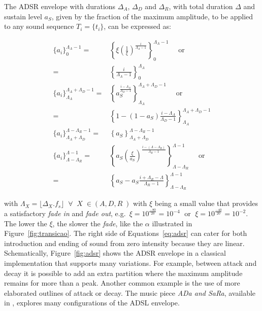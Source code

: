The ADSR envelope with durations $\Delta_A$, $\Delta_D$ and $\Delta_R$, with total duration $\Delta$ and sustain level $a_S$, given by the fraction of the maximum amplitude, to be applied to any sound sequence $T_i=\{t_i\}$, can be expressed as:

\begin{equation}\label{eq:adsr}
\begin{split}
\{a_i\}_0^{\Lambda_A-1}  = & \left\{\xi\left(\frac{1}{\xi}\right)^{\frac{i}{\Lambda_A-1}}\right\}_0^{\Lambda_A-1} \quad \text{ or }\\ = & \left\{\frac{i}{\Lambda_A-1}\right\}_0^{\Lambda_A}\\
\{a_i\}_{\Lambda_A}^{\Lambda_A+\Lambda_D-1} = & \left\{a_S^{\frac{i-\Lambda_A}{\Lambda_D-1}}  \right\}_{\Lambda_A}^{\Lambda_A+\Lambda_D-1} \quad \text{ or } \\ = &  \left\{1-(1-a_S)\frac{i-\Lambda_A}{\Lambda_D-1}\right\}_{\Lambda_A}^{\Lambda_A+\Lambda_D-1}\\
\{ a_i \}_{\Lambda_A+\Lambda_D}^{\Lambda-\Lambda_R-1} = & \left\{ a_S \right\}_{\Lambda_A+\Lambda_D}^{\Lambda-\Lambda_R-1} \\
\{ a_i \}_{\Lambda-\Lambda_R}^{\Lambda-1}  = & \left\{ a_S\left(\frac{\xi}{a_S} \right)^{\frac{i-(\Lambda-\Lambda_R)}{\Lambda_R-1}} \right\}_{\Lambda-\Lambda_R}^{\Lambda-1} \quad \text{ or } \\ = &  \left\{ a_S - a_S\frac{i+\Lambda_R-\Lambda}{\Lambda_R-1}\right\}_{\Lambda-\Lambda_R}^{\Lambda-1} 
\end{split}
\end{equation}


\noindent with $\Lambda_X=\lfloor \Delta_X . f_s \rfloor\;\;\forall\;\; X \; \in
(A,D,R\;)$ with $\xi$ being a small value that provides a satisfactory \emph{fade in} and \emph{fade out}, e.g.\ $\xi=10^{\frac{-80}{20}}=10^{-4}\;$ or $\;\xi=10^{\frac{-40}{20}}=10^{-2}$. The lower the $\xi$, the slower the \emph{fade}, like the $\alpha$ illustrated in Figure~\ref{fig:transicao}. The right side of Equations~\ref{eq:adsr} can cater for both introduction and ending of sound from zero intensity because they are linear. Schematically, Figure~\ref{fig:adsr} shows the ADSR envelope in a classical implementation that supports many variations. For example, between attack and decay it is possible to add an extra partition where the maximum amplitude remains for more than a peak. Another common example is the use of more elaborated outlines of attack or decay. The music piece \emph{ADa and SaRa}, available 
in \massa, explores many configurations of the ADSL envelope.

